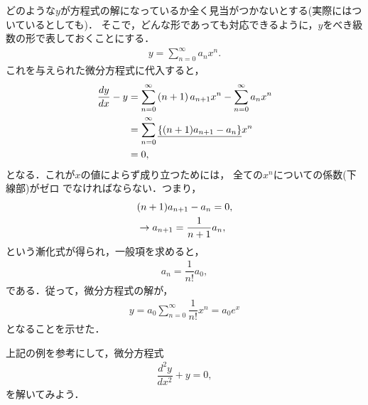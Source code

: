 \documentclass[11pt,a4]{jsarticle}
\numberwithin{equation}{section}
\begin{document}
どのような$y$が方程式の解になっているか全く見当がつかないとする(実際にはついているとしても)．
そこで，どんな形であっても対応できるように，$y$をべき級数の形で表しておくことにする．
\begin{align*}
  y = \sum_{n=0}^{\infty} a_{n}x^{n}. 
\end{align*}
これを与えられた微分方程式に代入すると，
\begin{align*}
  \dfrac{dy}{dx} - y &= \sum_{n=0}^{\infty}\left(n+1\right)a_{n+1}x^n 
                        - \sum_{n=0}^{\infty}a_n x^{n} \notag \\
                     &= \sum_{n=0}^{\infty}\underline{\left\{(n+1)a_{n+1}-a_n\right\}}x^{n} \notag \\
                     &= 0, 
\end{align*}
となる．これが$x$の値によらず成り立つためには，
全ての$x^{n}$についての係数(下線部)がゼロ
でなければならない．つまり，
\begin{align*}
  &(n+1)a_{n+1} - a_n = 0, \notag \\
  &\rightarrow a_{n+1} = \dfrac{1}{n+1}a_{n},
\end{align*}
という漸化式が得られ，一般項を求めると，
\begin{align*}
 a_n = \dfrac{1}{n!}a_0,
\end{align*}
である．従って，微分方程式の解が，
\begin{align*}
  y = a_0 \sum_{n=0}^{\infty}\dfrac{1}{n!}x^n = a_{0}e^{x} 
\end{align*}
となることを示せた．

上記の例を参考にして，微分方程式
\begin{align*}
  \dfrac{d^2y}{dx^2} + y = 0,
\end{align*}
を解いてみよう．
\end{document}
